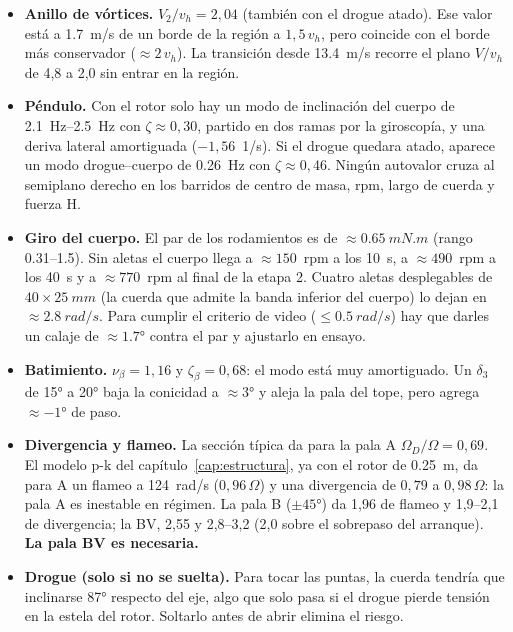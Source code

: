 \begin{resultado}
\begin{itemize}
  \item \textbf{Anillo de vórtices.} $V_2/v_h=2{,}04$ (también con el drogue atado). Ese
        valor está a \SI{1.7}{m/s} de un borde de la región a $1{,}5\,v_h$, pero coincide
        con el borde más conservador ($\approx2\,v_h$). La transición desde
        \SI{13.4}{m/s} recorre el plano $V/v_h$ de 4,8 a 2,0 sin entrar en la región.
  \item \textbf{Péndulo.} Con el rotor solo hay un modo de inclinación del cuerpo de
        \SIrange{2.1}{2.5}{Hz} con $\zeta\approx0{,}30$, partido en dos ramas por la
        giroscopía, y una deriva lateral amortiguada ($-1{,}56$~1/s). Si el drogue
        quedara atado, aparece un modo drogue--cuerpo de \SI{0.26}{Hz} con
        $\zeta\approx0{,}46$. Ningún autovalor cruza al semiplano derecho en los barridos
        de centro de masa, rpm, largo de cuerda y fuerza H.
  \item \textbf{Giro del cuerpo.} El par de los rodamientos es de
        $\approx\SI{0.65}{mN.m}$ (rango \numrange{0.31}{1.5}). Sin aletas el cuerpo llega a
        $\approx\num{150}$~rpm a los \SI{10}{s}, a $\approx\num{490}$~rpm a los
        \SI{40}{s} y a $\approx\num{770}$~rpm al final de la etapa 2. Cuatro aletas
        desplegables de $40\times\SI{25}{mm}$ (la cuerda que admite la banda inferior del cuerpo) lo dejan en
        $\approx\SI{2.8}{rad/s}$. Para cumplir el criterio de video
        ($\le\SI{0.5}{rad/s}$) hay que darles un calaje de $\approx\ang{1.7}$ contra el
        par y ajustarlo en ensayo.
  \item \textbf{Batimiento.} $\nu_\beta=1{,}16$ y $\zeta_\beta=0{,}68$: el modo está
        muy amortiguado. Un $\delta_3$ de \ang{15} a \ang{20} baja la conicidad a
        $\approx\ang{3}$ y aleja la pala del tope, pero agrega $\approx\ang{-1}$ de
        paso.
  \item \textbf{Divergencia y flameo.} La sección típica da para la pala A
        $\Omega_D/\Omega=0{,}69$. El modelo p-k del capítulo~\ref{cap:estructura}, ya con
        el rotor de \SI{0.25}{m}, da para A un flameo a \SI{124}{rad/s} ($0{,}96\,\Omega$)
        y una divergencia de $0{,}79$ a $0{,}98\,\Omega$: la pala A es inestable en régimen.
        La pala B ($\pm\ang{45}$) da 1,96 de flameo y 1,9--2,1 de divergencia; la BV, 2,55
        y 2,8--3,2 (2,0 sobre el sobrepaso del arranque). \textbf{La pala BV es
        necesaria.}
  \item \textbf{Drogue (solo si no se suelta).} Para tocar las puntas, la cuerda tendría
        que inclinarse \ang{87} respecto del eje, algo que solo pasa si el drogue pierde
        tensión en la estela del rotor. Soltarlo antes de abrir elimina el riesgo.
\end{itemize}
\end{resultado}


